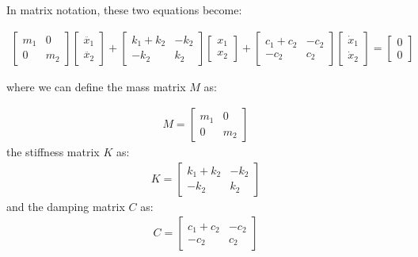 \documentclass[12pt,letter]{article}
\begin{document}
In matrix notation, these two equations become:

\begin{eqnarray} \label{EOM2DOF}
\begin{bmatrix} m_1 & 0  \\  0 & m_2 \end{bmatrix}\begin{bmatrix} \ddot{x_1} \\  \ddot{x_2} \end{bmatrix} + \begin{bmatrix} k_1+k_2 & -k_2  \\  -k_2 & k_2 \end{bmatrix}\begin{bmatrix} x_1 \\  x_2 \end{bmatrix} + \begin{bmatrix} c_1 + c_2 & -c_2  \\  -c_2 & c_2 \end{bmatrix}\begin{bmatrix} \dot{x}_1 \\  \dot{x}_2 \end{bmatrix} = \begin{bmatrix} 0 \\  0 \end{bmatrix}
\end{eqnarray}

\noindent where we can define the mass matrix $M$ as:
		
\begin{eqnarray}
M=  \begin{bmatrix} m_1 & 0  \\  0 & m_2 \end{bmatrix}  
\end{eqnarray}
 the stiffness matrix $K$ as:
\begin{eqnarray}
K=  \begin{bmatrix} k_1+k_2 & -k_2  \\  -k_2 & k_2 \end{bmatrix}
\end{eqnarray}		
and the damping matrix $C$ as:
\begin{eqnarray}
C=  \begin{bmatrix} c_1+c_2 & -c_2  \\  -c_2 & c_2 \end{bmatrix}
\end{eqnarray}
		
\end{document}
